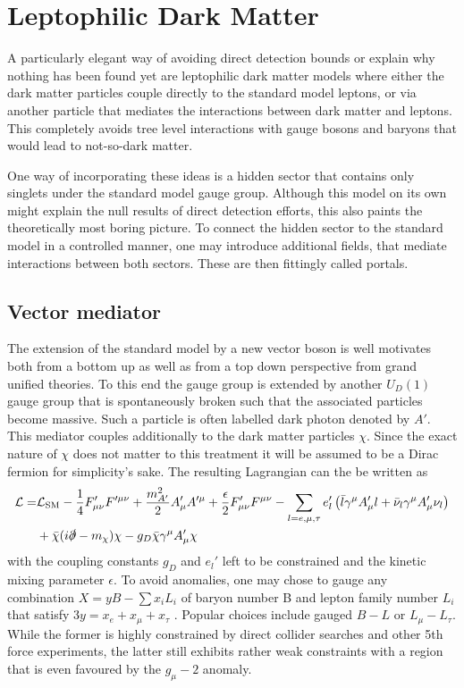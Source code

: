\chapter{Leptophilic Dark Matter}
\label{ch:LepDM}
A particularly elegant way of avoiding direct detection bounds or explain why nothing has been found yet are leptophilic dark matter models where either the dark matter particles couple directly to the standard model leptons, or via another particle that mediates the interactions between dark matter and leptons. This completely avoids tree level interactions with gauge bosons and baryons that would lead to not-so-dark matter.

One way of incorporating these ideas is a hidden sector that contains only singlets under the standard model gauge group. Although this model on its own might explain the null results of direct detection efforts, this also paints the theoretically most boring picture. To connect the hidden sector to the standard model in a controlled manner, one may introduce additional fields, that mediate interactions between both sectors. These are then fittingly called portals. 

\section{Vector mediator}
The extension of the standard model by a new vector boson is well motivates both from a bottom up as well as from a top down perspective from grand unified theories. To this end the gauge group is extended by another $U_D(1)$ gauge group that is spontaneously broken such that the associated particles become massive. Such a particle is often labelled dark photon denoted by $A'$. This mediator couples additionally to the dark matter particles $\chi$. Since the exact nature of $\chi$ does not matter to this treatment it will be assumed to be a Dirac fermion for simplicity's sake.
The resulting Lagrangian can the be written as 
\begin{align*}
\mathcal{L}=& \mathcal{L}_\text{SM}-\frac{1}{4}F_{\mu\nu}'F'^{\mu\nu}+\frac{m_{A'}^2}{2}A_\mu'A'^\mu +\frac{\epsilon}{2}F_{\mu\nu}'F^{\mu\nu}-\sum_{l=e,\mu,\tau} e'_l\left(\bar{l}\gamma^\mu A'_\mu l+\bar{\nu}_l\gamma^\mu A'_\mu \nu_l\right)\\&+\bar{\chi}(i\slashed{\partial}-m_\chi)\chi -g_D\bar{\chi}\gamma^\mu A_\mu'\chi
\end{align*}
with the coupling constants $g_D$ and $e_l'$ left to be constrained and the kinetic mixing parameter $\epsilon$.
To avoid anomalies, one may chose to gauge any combination $X=yB-\sum x_iL_i$ of baryon number B and lepton family number $L_i$ that satisfy $3y=x_e+x_\mu+x_\tau$ \cite{Altmannshofer:2014pba}. Popular choices include gauged $B-L$ or $L_\mu-L_\tau$. While the former is highly constrained by direct collider searches and other 5th force experiments, the latter still exhibits rather weak constraints with a region that is even favoured by the $g_\mu -2$ anomaly.



